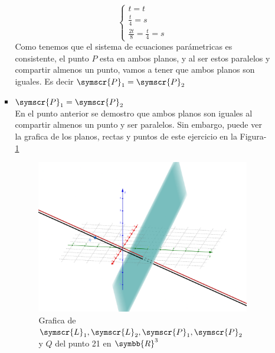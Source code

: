 \documentclass{article}
\def\fancyL{\symscr{L}}
\def\fancyP{\symscr{P}}
\def\realR{\symbb{R}}
\begin{document}
\begin{enumerate}
\begin{itemize}
\begin{itemize}
\[\begin{cases}
                            t = t \\
                            \frac{t}{4} = s \\
                            \frac{2t}{8} = \frac{t}{4} = s
                        \end{cases}
                    \]
                    Como tenemos que el sistema de ecuaciones parámetricas es consistente, el punto \(P\) esta en ambos planos, y al ser estos paralelos y compartir almenos un punto,
                    vamos a tener que ambos planos son iguales. Es decir \(\fancyP_1 = \fancyP_2\)
                \item \(\fancyP_1 = \fancyP_2\) \\
                    En el punto anterior se demostro que ambos planos son iguales al compartir almenos un punto y ser paralelos. Sin embargo, puede ver la grafica de los planos, rectas y puntos de este ejercicio en 
                    la Figura-\ref{pt-twentyone-graph}           
                    \begin{figure}
                        \centering
                        \includegraphics[width=15cm]{src/21_graph.png}
                        \caption{Grafica de \(\fancyL_1, \fancyL_2, \fancyP_1, \fancyP_2\) y \(Q\) del punto 21 en \(\realR^3\)}%
                        \label{pt-twentyone-graph}
                    \end{figure}
            \end{itemize}
    \end{itemize}
\end{enumerate}
\end{document}
